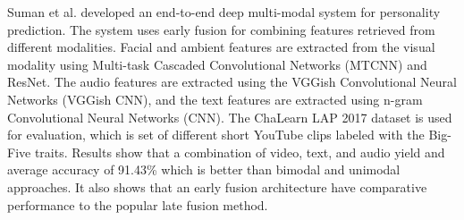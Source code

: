Suman et al. \cite{video-interview4-SUMAN2022107715} developed an end-to-end deep multi-modal system for personality prediction. The system uses early fusion for combining features retrieved from different modalities. Facial and ambient features are extracted from the visual modality using Multi-task Cascaded Convolutional Networks (MTCNN) and ResNet. The audio features are extracted using the VGGish Convolutional Neural Networks (VGGish CNN), and the text features are extracted using n-gram Convolutional Neural Networks (CNN). The ChaLearn LAP 2017 dataset is used for evaluation, which is set of different short YouTube clips labeled with the Big-Five traits. Results show that a combination of video, text, and audio yield and average accuracy of 91.43\% which is better than bimodal and unimodal approaches. It also shows that an early fusion architecture have comparative performance to the popular late fusion method.  \\ 






